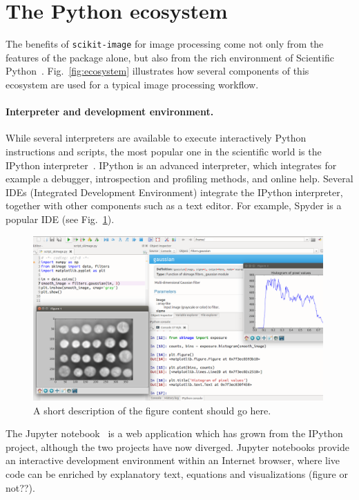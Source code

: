 \documentclass[twocolumn]{bmcart}%
\begin{document}
\section*{The Python ecosystem}

The benefits of \texttt{scikit-image} for image processing come not only
from the features of the package alone, but also from the rich
environment of Scientific Python~\citep{Oliphant2007, Perez2011}.
Fig.~\ref{fig:ecosystem} illustrates how several components of this
ecosystem are used for a typical image processing workflow. 

\paragraph{Interpreter and development environment.}

While several interpreters are available to execute interactively Python
instructions and scripts, the most popular one in the scientific world is
the IPython interpreter~\citep{Perez2007, Rossant2015}. IPython is an
advanced interpreter, which integrates for example a debugger,
introspection and profiling methods, and online help. Several IDEs
(Integrated Development Environment) integrate the IPython interpreter,
together with other components such as a text editor. For example, Spyder 
is a popular IDE (see Fig.~\ref{fig:spyder}).

\begin{figure}
    \centerline{\includegraphics[width=0.99\textwidth]{spyder_process}}
\caption{
      A short description of the figure content
  should go here. \label{fig:spyder}}
\end{figure}

The Jupyter notebook~\citep{Kluyver2016} is a web application which has
grown from the IPython project, although the two projects have now
diverged. Jupyter notebooks provide an interactive development
environment within an Internet browser, where live code can be enriched
by explanatory text, equations and visualizations (figure or not??). 
\end{document}
